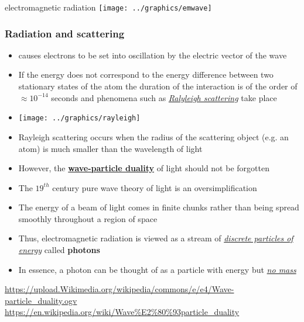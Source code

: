 \documentclass[ignorenonframetext]{beamer}
\begin{document}
\begin{frame}{electromagnetic radiation}
\texttt{[image: ../graphics/emwave]}
\end{frame}
	

\begin{frame}[allowframebreaks]
\frametitle{Radiation and scattering}
\begin{itemize}
\item {\color{red}{Electromagnetic radiation}} causes electrons to be set into oscillation by the electric vector of the wave
\item If the energy does not correspond to the energy difference between two stationary states of the atom the duration of the interaction is of the order of \(\approx 10^{-14}\) seconds and phenomena such as \textit{\underline{Ralyleigh scattering}} take place
\item[] \texttt{[image: ../graphics/rayleigh]}
\item Rayleigh scattering occurs when the radius of the scattering object (e.g. an atom) is much smaller than the wavelength of light 
\end{itemize}
\end{frame}

\begin{frame}
\begin{itemize}
\item However, the \textbf{\underline{wave-particle duality}} of light should not be forgotten
\item The \(19^{th}\) century pure wave theory of light is an oversimplification
\item The energy of a beam of light comes in finite chunks rather than being spread smoothly throughout a region of space
\item Thus, electromagnetic radiation is viewed as a stream of \textit{\underline{discrete particles of energy}} called \textbf{\color{red}photons}
\item In essence, a photon can be thought of as a particle with energy but \textit{\underline{no mass}}
\end{itemize}
\url{https://upload.Wikimedia.org/wikipedia/commons/e/e4/Wave-particle_duality.ogv} \newline
\url{https://en.wikipedia.org/wiki/Wave\%E2\%80\%93particle_duality}
\end{frame}

\vspace{1in}
\end{document}
